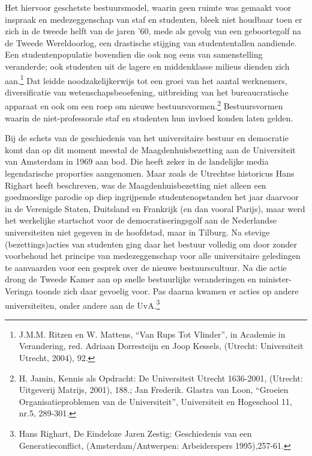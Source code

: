 \documentclass{jote-book}
\begin{document}
	Het hiervoor geschetste bestuursmodel, waarin geen ruimte was gemaakt voor inspraak en medezeggenschap van staf en studenten, bleek niet houdbaar toen er zich in de tweede helft van de jaren '60, mede als gevolg van een geboortegolf na de Tweede Wereldoorlog, een drastische stijging van studententallen aandiende. Een studentenpopulatie bovendien die ook nog eens van samenstelling veranderde; ook studenten uit de lagere en middenklasse milieus dienden zich aan.\footnote{J.M.M. Ritzen en W. Mattens, “Van Rups Tot Vlinder”, in Academie in Verandering, red. Adriaan Dorresteijn en Joop Kessels, (Utrecht: Universiteit Utrecht, 2004), 92.} Dat leidde noodzakelijkerwijs tot een groei van het aantal werknemers, diversificatie van wetenschapsbeoefening, uitbreiding van het bureaucratische apparaat en ook om een roep om nieuwe bestuursvormen.\footnote{H. Jamin, Kennis als Opdracht: De Universiteit Utrecht 1636-2001, (Utrecht: Uitgeverij Matrijs, 2001), 188.; Jan Frederik. Glastra van Loon, “Groeien Organisatieproblemen van de Universiteit”, Universiteit en Hogeschool 11, nr.5, 289-301.} Bestuursvormen waarin de niet-professorale staf en studenten hun invloed konden laten gelden.



	Bij de schets van de geschiedenis van het universitaire bestuur en democratie komt dan op dit moment meestal de Maagdenhuisbezetting aan de Universiteit van Amsterdam in 1969 aan bod. Die heeft zeker in de landelijke media legendarische proporties aangenomen. Maar zoals de Utrechtse historicus Hans Righart heeft beschreven, was de Maagdenhuisbezetting niet alleen een goedmoedige parodie op diep ingrijpende studentenopstanden het jaar daarvoor in de Verenigde Staten, Duitsland en Frankrijk (en dan vooral Parijs), maar werd het werkelijke startschot voor de democratiseringsgolf aan de Nederlandse universiteiten niet gegeven in de hoofdstad, maar in Tilburg. Na stevige (bezettings)acties van studenten ging daar het bestuur volledig om door zonder voorbehoud het principe van medezeggenschap voor alle universitaire geledingen te aanvaarden voor een gesprek over de nieuwe bestuurscultuur. Na die actie drong de Tweede Kamer aan op snelle bestuurlijke veranderingen en minister-Veringa toonde zich daar gevoelig voor. Pas daarna kwamen er acties op andere universiteiten, onder andere aan de UvA.\footnote{Hans Righart, De Eindeloze Jaren Zestig: Geschiedenis van een Generatieconflict, (Amsterdam/Antwerpen: Arbeiderspers 1995),257-61.}
\end{document}
